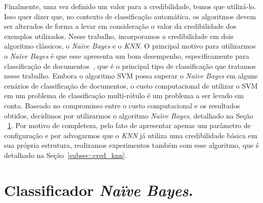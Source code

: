 Finalmente, uma vez definido um valor para a credibilidade, temos que utilizá-lo. Isso quer dizer que, no contexto de classificação automática, os algoritmos devem ser alterados de forma a levar em consideração o valor da credibilidade dos exemplos utilizados. Nesse trabalho, incorporamos a credibilidade em dois algoritmo clássicos, o \textit{Naïve Bayes} e o \textit{KNN}. O principal motivo para utilizarmos o \textit{Naïve Bayes} é que esse apresenta um bom desempenho, especificamente para classificação de documentos~\cite{salles10}, que é o principal tipo de classificação que tratamos nesse trabalho. Embora o algoritmo SVM possa superar o \textit{Naïve Bayes} em alguns cenários de classificação de documentos, o custo computacional de utilizar o SVM em um problema de classificação multi-rótulo é um problema a ser levado em conta. Baseado no compromisso entre o custo computacional e os resultados obtidos, decidimos por utilizarmos o algoritmo \textit{Naïve Bayes}, detalhado na Seção ~\ref{subsec::cred_nb}. Por motivo de completeza, pelo fato de apresentar apenas um parâmetro de configuração e por advogarmos que o \textit{KNN} já utiliza uma credibilidade básica em sua própria estrutura, realizamos experimentos também com esse algoritmo, que é detalhado na Seção~\ref{subsec::cred_knn}.


\section{Classificador \textit{Naïve Bayes}.}
\label{subsec::cred_nb}

